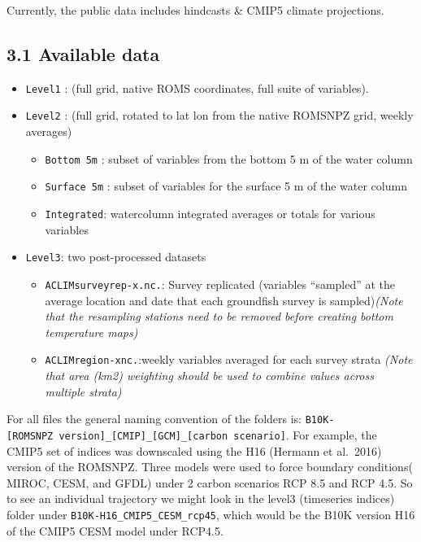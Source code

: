 \documentclass[
]{article}
\providecommand{\tightlist}{%
  \setlength{\itemsep}{0pt}\setlength{\parskip}{0pt}}
\begin{document}
Currently, the public data includes hindcasts \& CMIP5 climate
projections.

\hypertarget{available-data}{%
\subsection{3.1 Available data}\label{available-data}}

\begin{itemize}
\tightlist
\item
  \texttt{Level1} : (full grid, native ROMS coordinates, full suite of
  variables).
\item
  \texttt{Level2} : (full grid, rotated to lat lon from the native
  ROMSNPZ grid, weekly averages)

  \begin{itemize}
  \tightlist
  \item
    \texttt{Bottom\ 5m} : subset of variables from the bottom 5 m of the
    water column
  \item
    \texttt{Surface\ 5m} : subset of variables for the surface 5 m of
    the water column
  \item
    \texttt{Integrated}: watercolumn integrated averages or totals for
    various variables
  \end{itemize}
\item
  \texttt{Level3}: two post-processed datasets

  \begin{itemize}
  \tightlist
  \item
    \texttt{ACLIMsurveyrep-x.nc.}: Survey replicated (variables
    ``sampled'' at the average location and date that each groundfish
    survey is sampled)\emph{(Note that the resampling stations need to
    be removed before creating bottom temperature maps)}\\
  \item
    \texttt{ACLIMregion-xnc.}:weekly variables averaged for each survey
    strata \emph{(Note that area (km2) weighting should be used to
    combine values across multiple strata)}
  \end{itemize}
\end{itemize}

For all files the general naming convention of the folders is:
\texttt{B10K-{[}ROMSNPZ\ version{]}\_{[}CMIP{]}\_{[}GCM{]}\_{[}carbon\ scenario{]}}.
For example, the CMIP5 set of indices was downscaled using the H16
(Hermann et al.~2016) version of the ROMSNPZ. Three models were used to
force boundary conditions( MIROC, CESM, and GFDL) under 2 carbon
scenarios RCP 8.5 and RCP 4.5. So to see an individual trajectory we
might look in the level3 (timeseries indices) folder under
\texttt{B10K-H16\_CMIP5\_CESM\_rcp45}, which would be the B10K version
H16 of the CMIP5 CESM model under RCP4.5.
\end{document}
